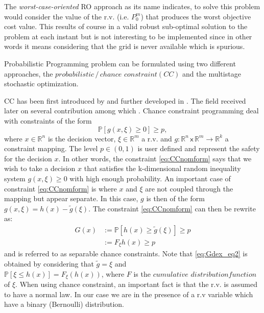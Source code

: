 \documentclass{ifacconf}
\begin{document}
The \textit{worst-case-oriented} RO approach as its name indicates, to solve this problem would consider the value of the r.v. (i.e. $P_0^{m}$) that produces the worst objective cost value. This results of course in a valid robust sub-optimal solution to the problem at each instant but is not interesting to be implemented since in other words it means considering that the grid is never available which is spurious.
 
 
  Probabilistic Programming problem can be formulated using two different approaches, the $probabilistic\,/\,chance$  $constraint (CC)$ and  the multistage stochastic optimization.
  
 CC has been first introduced by \cite{AChWCo1958} and further developed in \cite{AChWCo1959,AChWCo1962,AchWCo1963}. The field received later on several contribution among which \cite{AnPre1970,Tsentai1988,APrBVi1998,RHenrion2002,RHenrion2007}. 
 Chance constraint programming deal with constraints of the form
 \begin{equation}\label{eq:CCnomform}
     \mathbb{P}[g(x,\xi)\geq 0]\geq p,
 \end{equation}
 where $x \in \mathbb{R}^n$ is the decision vector, $\xi \in \mathbb{R}^m$ a r.v. and  $g: \mathbb{R}^n \mathsf{\,x\,}\mathbb{R}^m \rightarrow \mathbb{R}^k$ a constraint mapping. The level $p \in (0,1)$ is user defined and represent the safety for the decision $x$. In other words, the constraint \eqref{eq:CCnomform} says that we wish to take a decision $x$ that satisfies the k-dimensional random inequality system $g(x,\xi)\geq 0 $ with high enough probability. An important case of constraint \eqref{eq:CCnomform} is where  $x$ and $\xi$ are not coupled through the mapping but appear separate. In this case, $g$ is then of the form $g(x,\xi) = h(x)− \widetilde{g}(\xi)$. The constraint \eqref{eq:CCnomform} can then be rewrite as:
 \begin{align}
     G(x)&:= \mathbb{P}[h(x) \geq \widetilde{g}(\xi)]\geq p \label{eq:Gdex_eq1}\\
         &:= F_\xi{h(x)}\geq p \label{eq:Gdex_eq2}
 \end{align}
 and is referred to as separable chance constraints. Note that \eqref{eq:Gdex_eq2} is \;\; obtained \; by \; considering  \;that \; $\widetilde{g} = \xi$ and \\  $\mathbb{P}[\xi \leq h(x)] = F_\xi(h(x))$, where $F$ is the $ cumulative$  $distribution function$ of $\xi$.
 When using chance constraint, an important fact is that the r.v.  is assumed to have a normal law. In our case we are in the presence of a r.v variable which have a binary (Bernoulli) distribution.
 
\end{document}
